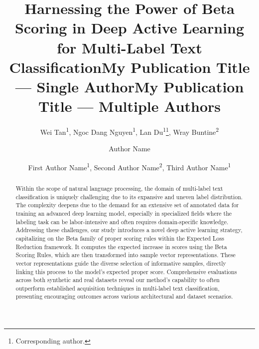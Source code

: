 \documentclass[letterpaper]{article} %
\title{Harnessing the Power of Beta Scoring in Deep Active Learning for Multi-Label Text Classification}
\author{
    Wei Tan\textsuperscript{\rm 1},
    Ngoc Dang Nguyen\textsuperscript{\rm 1},
        Lan Du\textsuperscript{\rm 1}\thanks{Corresponding author.},
        Wray Buntine\textsuperscript{\rm 2}
}
\title{My Publication Title --- Single Author}
\author {
    Author Name
}
\title{My Publication Title --- Multiple Authors}
\author {
    First Author Name\textsuperscript{\rm 1},
    Second Author Name\textsuperscript{\rm 2},
    Third Author Name\textsuperscript{\rm 1}
}
\begin{document}
\maketitle

\begin{abstract}

Within the scope of natural language processing, the domain of multi-label text classification is uniquely challenging due to its expansive and uneven label distribution. The complexity deepens due to the demand for an extensive set of annotated data for training an advanced deep learning model, especially in specialized fields where the labeling task can be labor-intensive and often requires domain-specific knowledge. Addressing these challenges, our study introduces a novel deep active learning strategy, capitalizing on the Beta family of proper scoring rules within the Expected Loss Reduction framework. It computes the expected increase in scores using the Beta Scoring Rules,  which are then transformed into sample vector representations. These vector representations guide the diverse selection of informative samples, directly linking this process to the model's expected proper score.
Comprehensive evaluations across both synthetic and real datasets reveal our method's capability to often outperform established acquisition techniques in multi-label text classification, presenting encouraging outcomes across various architectural and dataset scenarios.


\end{abstract}
\end{document}
